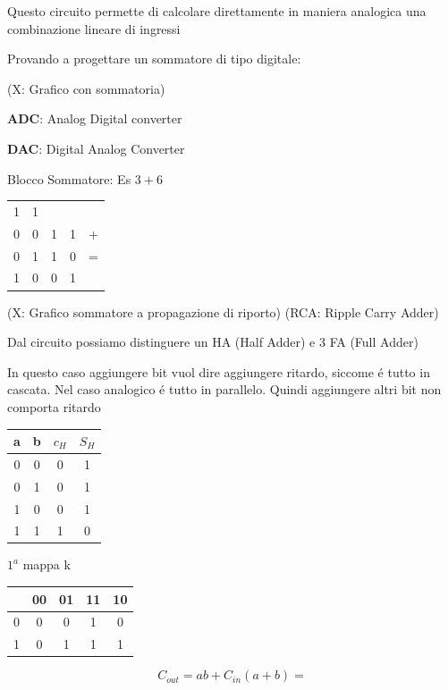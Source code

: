 \documentclass{article}
\begin{document}
Questo circuito permette di calcolare direttamente in maniera analogica una combinazione lineare di ingressi

Provando a progettare un sommatore di tipo digitale:

(X: Grafico con sommatoria)

\textbf{ADC}: Analog Digital converter

\textbf{DAC}: Digital Analog Converter

Blocco Sommatore: Es $3+6$

\begin{tabular}{c c c c c}
    1 & 1 & \\
    0 & 0 & 1 & 1 & + \\
    0 & 1 & 1 & 0 & = \\
    \hline
    1 & 0 & 0 & 1
\end{tabular}

(X: Grafico sommatore a propagazione di riporto)
(RCA: Ripple Carry Adder)

Dal circuito possiamo distinguere un HA (Half Adder) e 3 FA (Full Adder)

In questo caso aggiungere bit vuol dire aggiungere ritardo, siccome \'e tutto in cascata. Nel caso analogico \'e tutto in parallelo. Quindi aggiungere altri bit non comporta ritardo

\begin{tabular}{c c|c c}
    a & b & $c_H$ & $S_H$\\
    \hline
    0 & 0 & 0 & 1 \\
    0 & 1 & 0 & 1 \\
    1 & 0 & 0 & 1 \\
    1 & 1 & 1 & 0
\end{tabular}


$1^a$ mappa k
\begin{center}
    \begin{tabular}{c|c c c c}
    & 00 & 01 & 11 & 10\\
    \hline
        0 & 0 & 0 & 1 & 0\\
        1 & 0 & 1 & 1 & 1\\
    \end{tabular}
\end{center}
\[ C_{out} = ab + C_{in} (a+b) = \]
\end{document}
